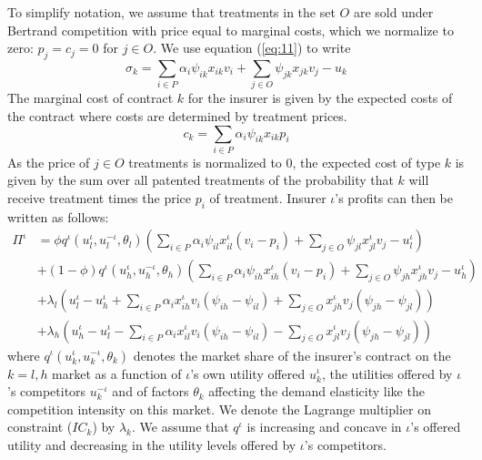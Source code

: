 \documentclass[12pt,english,a4paper]{article}
\begin{document}
To simplify notation, we assume that treatments in the set \(O\) are sold under Bertrand competition with price equal to marginal costs, which we normalize to zero: \(p_j = c_j =0\) for \(j \in O\). We use equation (\ref{eq:11}) to write
\begin{equation}
\label{eq:13}
\sigma_k = \sum_{i \in P} \alpha_i \psi_{ik} x_{ik} v_i + \sum_{j \in O} \psi_{jk} x_{jk} v_j - u_k
\end{equation}
The marginal cost of contract \(k\) for the insurer is given by the expected costs of the contract where costs are determined by treatment prices.
\begin{equation}
\label{eq:14}
c_k = \sum_{i \in P} \alpha_i \psi_{ik} x_{ik} p_i
\end{equation}
As the price of \(j \in O\) treatments is normalized to 0, the expected cost of type \(k\) is given by the sum over all patented treatments of the probability that \(k\) will receive treatment times the price \(p_i\) of treatment. Insurer \(\iota\)'s profits can then be written as follows:
\begin{equation}
\label{eq:15}
\begin{split}
\Pi^{\iota} &= \phi q^{\iota}(u_l^{\iota},u_l^{-\iota},\theta_l) (\sum_{i \in P} \alpha_i \psi_{il} x_{il}^{\iota} (v_i-p_i) + \sum_{j \in O} \psi_{jl} x_{jl}^{\iota} v_j - u_l^{\iota}) \\
    &+ (1-\phi) q^{\iota}(u_h^{\iota},u_h^{-\iota},\theta_h) (\sum_{i \in P} \alpha_i \psi_{ih} x_{ih}^{\iota} (v_i-p_i) + \sum_{j \in O} \psi_{jh} x_{jh}^{\iota} v_j - u_h^{\iota}) \\
    &+ \lambda_l (u_l^{\iota} - u_h^{\iota} + \sum_{i \in P} \alpha_i x_{ih}^{\iota} v_i (\psi_{ih}-\psi_{il}) + \sum_{j \in O} x_{jh}^{\iota} v_j (\psi_{jh}-\psi_{jl})) \\
    &+ \lambda_h (u_h^{\iota} - u_l^{\iota} - \sum_{i \in P} \alpha_i x_{il}^{\iota} v_i (\psi_{ih}-\psi_{il}) - \sum_{j \in O} x_{jl}^{\iota} v_j (\psi_{jh}-\psi_{jl}))
\end{split}
\end{equation}
where \(q^{\iota}(u_k^{\iota},u_k^{-\iota},\theta_k)\) denotes the market share of the insurer's contract on the \(k=l,h\) market as a function of \(\iota\)'s own utility offered \(u_k^{\iota}\), the utilities offered by \(\iota\)'s competitors \(u_k^{-\iota}\) and of factors \(\theta_k\) affecting the demand elasticity like the competition intensity on this market. We denote the Lagrange multiplier on constraint (\(IC_k\)) by \(\lambda_k\). We assume that \(q^{\iota}\) is increasing and concave in \(\iota\)'s offered utility and decreasing in the utility levels offered by \(\iota\)'s competitors.
\end{document}
